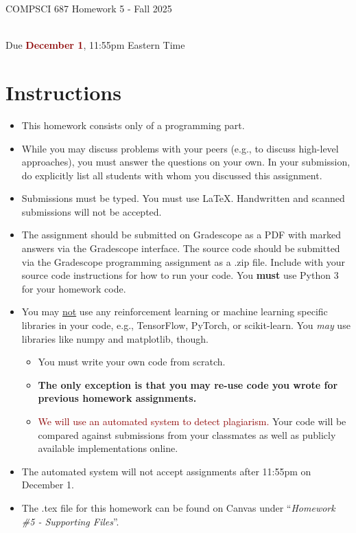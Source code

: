 \documentclass{article}
\begin{document}
\newpage
\vspace*{1cm}
\begin{center}
    \begin{Large}
    COMPSCI 687 Homework 5 - Fall 2025
    \end{Large}
    \\
    \vspace{0.15cm}
    Due \textcolor{darkred}{\textbf{December 1}}, 11:55pm Eastern Time
\end{center}



\vspace{1.0cm}
\section{Instructions}

\begin{itemize}
    \item This homework consists only of a programming part.
    \item While you may discuss problems with your peers (e.g., to discuss high-level approaches), you must answer the questions on your own. In your submission, do explicitly list all students with whom you discussed this assignment. 
    \item Submissions must be typed. You must use \LaTeX. Handwritten and scanned submissions will not be accepted. 
    \item The assignment should be submitted on Gradescope as a PDF with marked answers via the Gradescope interface. The source code should be submitted via the Gradescope programming assignment as a .zip file. Include with your source code instructions for how to run your code. You \textbf{must} use Python 3 for your homework code. 
    \item You may \underline{not} use any reinforcement learning or machine learning specific libraries in your code, e.g., TensorFlow, PyTorch, or scikit-learn. You \textit{may} use libraries like numpy and matplotlib, though.
    \begin{itemize}
    \item You must write your own code from scratch. 
    \item \textbf{The only exception is that you may re-use code you wrote for previous homework assignments. }
    \item \textcolor{darkred}{We will use an automated system to detect plagiarism.} Your code will be compared against submissions from your classmates as well as publicly available implementations online.
    \end{itemize}
    \item The automated system will not accept assignments after 11:55pm on December 1. 
    \item The .tex file for this homework can be found on Canvas under ``\textit{Homework \#5 - Supporting Files}''. 
\end{itemize}
\end{document}
